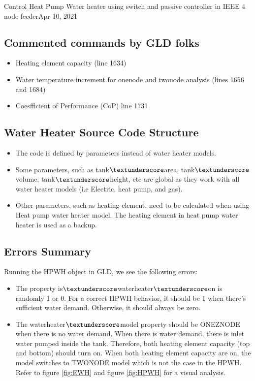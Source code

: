 \begin{entry}{Control Heat Pump Water heater using switch and passive controller in IEEE 4 node feeder}{Apr 10, 2021}
\subsection{Commented commands by GLD folks}
\begin{itemize}
    \item Heating element capacity (line 1634)
    \item Water temperature increment for onenode and twonode analysis (lines 1656 and 1684)
    \item Coesfficient of Performance (CoP) line 1731
\end{itemize}
\subsection{Water Heater Source Code Structure}
\begin{itemize}
    \item The code is defined by parameters instead of water heater models. 
    \item Some parameters, such as tank$\textunderscore$area, tank$\textunderscore$volume, tank$\textunderscore$height, etc are global as they work with all water heater models (i.e Electric, heat pump, and gas).
    \item Other parameters, such as heating element, need to be calculated when using Heat pump water heater model. The heating element in heat pump water heater is used as a backup.
\end{itemize}
\subsection{Errors Summary}
Running the HPWH object in GLD, we see the following errors:
\begin{itemize}
    \item The property is$\textunderscore$waterheater$\textunderscore$on is randomly 1 or 0. For a correct HPWH behavior, it should be 1 when there's sufficient water demand. Otherwise, it should always be zero.
    \item The waterheater$\textunderscore$model property should be ONEZNODE when there is no water demand. When there is water demand, there is inlet water pumped inside the tank. Therefore, both heating element capacity (top and bottom) should turn on. When both heating element capacity are on, the model switches to TWONODE model which is not the case in the HPWH. Refer to figure \ref{fig:EWH} and figure \ref{fig:HPWH} for a visual analysis.
\end{itemize}

\end{entry}
